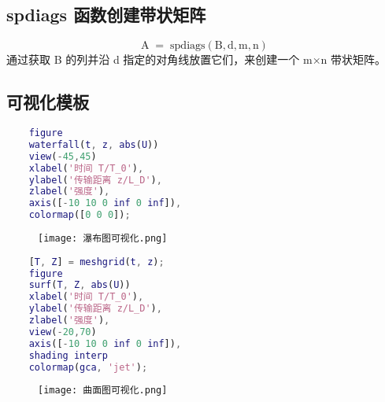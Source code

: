 \subsection*{spdiags 函数创建带状矩阵}
$$
\mathrm{A\; =\; spdiags(B,d,m,n)}
$$
通过获取 B 的列并沿 d 指定的对角线放置它们，来创建一个 m×n 带状矩阵。

\subsection*{可视化模板}
\begin{multicols}{2}
  \begin{lstlisting}[language=Matlab,
  morekeywords={},
  emph={waterfall, view, colormap},
  caption={}
  ]
    %% 瀑布图可视化
    figure
    waterfall(t, z, abs(U))
    view(-45,45)
    xlabel('时间 T/T_0'),
    ylabel('传输距离 z/L_D'),
    zlabel('强度'),
    axis([-10 10 0 inf 0 inf]),
    colormap([0 0 0]); 
  \end{lstlisting}
  \begin{figure}[H]
    \centering
    \texttt{[image: 瀑布图可视化.png]}
  \end{figure}
\end{multicols}

\begin{multicols}{2}
  \begin{lstlisting}[language=Matlab,
  morekeywords={},
  emph={meshgrid, surf, shading, view, colormap},
  caption={}
  ]
    %% 曲面图可视化
    [T, Z] = meshgrid(t, z);
    figure
    surf(T, Z, abs(U))
    xlabel('时间 T/T_0'),
    ylabel('传输距离 z/L_D'),
    zlabel('强度'),
    view(-20,70)
    axis([-10 10 0 inf 0 inf]),
    shading interp
    colormap(gca, 'jet');
  \end{lstlisting}
  \begin{figure}[H]
    \centering
    \texttt{[image: 曲面图可视化.png]}
  \end{figure}
\end{multicols}
